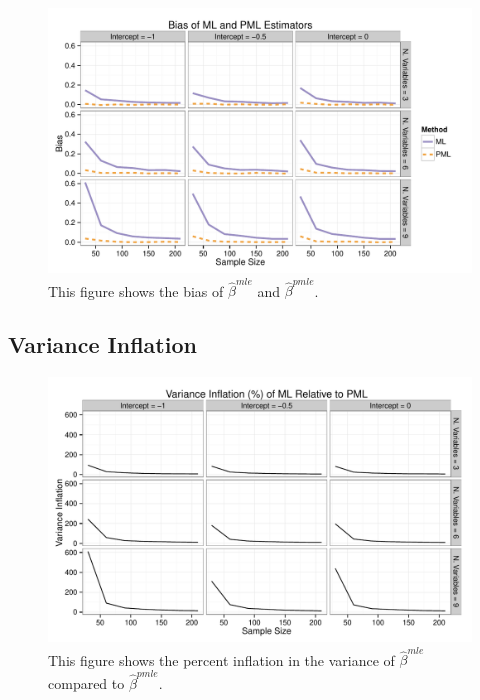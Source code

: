 \documentclass[12pt]{article}
\begin{document}
\begin{appendix}
\begin{figure}[H]
\begin{center}
\includegraphics[width = \textwidth]{figs/sims-bias.pdf}
\caption{This figure shows the bias of $\hat{\beta}^{mle}$ and $\hat{\beta}^{pmle}$.}\label{fig:bias}
\end{center}
\end{figure}

\subsection{Variance Inflation}

\begin{figure}[H]
\begin{center}
\includegraphics[width = \textwidth]{figs/sims-var-infl.pdf}
\caption{This figure shows the percent inflation in the variance of $\hat{\beta}^{mle}$ compared to $\hat{\beta}^{pmle}$.}\label{fig:var-infl}
\end{center}
\end{figure}


\end{appendix}
\end{document}
